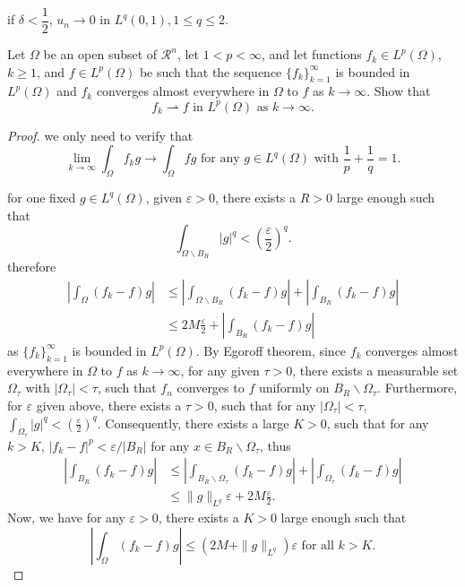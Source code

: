 if $\delta < \dfrac{1}{2}$, $u_n\rightarrow0$ in $L^q(0,1), 1\leqslant q \leqslant 2$.

\begin{lemma}
Let $\Omega$ be an open subset of $\mathcal{R}^n$, let $1<p<\infty$, and let functions $f_k\in L^p(\Omega)$, $k\geqslant1$, and $f\in L^p(\Omega)$ be such that the sequence $\{f_k\}_{k=1}^{\infty}$ is bounded in $L^p(\Omega)$ and $f_k$ converges almost everywhere in $\Omega$ to $f$ as $k\rightarrow \infty$. Show that 
\begin{equation}
	f_k\rightharpoonup f \text{ in } L^p(\Omega) \text{ as } k\rightarrow \infty.
\end{equation}	
\end{lemma}

\begin{proof}
	we only need to verify that
	\begin{equation}
		\lim_{k\rightarrow\infty}\int_\Omega f_kg\rightarrow\int_\Omega fg \text{ for any } g\in L^q(\Omega) \text{ with } \frac1p+\frac1q=1.
	\end{equation}

	for one fixed $g\in L^q(\Omega)$, given $\varepsilon>0$, there exists a $R>0$ large enough such that 
	\begin{equation}
		\int_{\Omega\backslash B_R}|g|^q < (\frac\varepsilon2)^q.
	\end{equation}
therefore 
\begin{equation}
	\begin{split}
	|\int_\Omega(f_k-f)g|&\leqslant|\int_{\Omega\backslash B_R}(f_k-f)g| + |\int_{B_R}(f_k-f)g|\\
	&\leqslant 2M\frac\varepsilon2 + |\int_{B_R}(f_k-f)g|
\end{split}
\end{equation}
as $\{f_k\}_{k=1}^{\infty}$ is bounded in $L^p(\Omega)$. 
By Egoroff theorem, since $f_k$ converges almost everywhere in $\Omega$ to $f$ as $k\rightarrow \infty$, 
for any given $\tau>0$, there exists a measurable set $\Omega_\tau$ with $|\Omega_\tau|<\tau$, 
such that $f_n$ converges to $f$ uniformly on $B_R\backslash \Omega_\tau$. 
Furthermore, for $\varepsilon$ given above, there exists a $\tau>0$, 
such that for any $|\Omega_\tau|<\tau$, $\int_{\Omega_\tau}|g|^q<(\frac{\varepsilon}{2})^q.$ 
Consequently, there exists a large $K>0$, 
such that for any $k>K$, $|f_k-f|^p<\varepsilon/|B_R|$ for any $x\in B_R\backslash \Omega_\tau$, thus
\begin{equation}
	\begin{split}
		|\int_{B_R}(f_k-f)g|&\leqslant |\int_{B_R\backslash \Omega_\tau}(f_k-f)g| 
		+ |\int_{\Omega_\tau}(f_k-f)g|\\
		&\leqslant \|g\|_{L^q}\varepsilon +2M\frac{\varepsilon}{2}.
	\end{split}
\end{equation}
Now, we have for any $\varepsilon>0$, there exists a $K>0$ large enough such that 
\begin{equation}
	|\int_\Omega(f_k-f)g|\leqslant (2M+ \|g\|_{L^q})\varepsilon \text{ for all } k> K.
\end{equation}
\end{proof}

